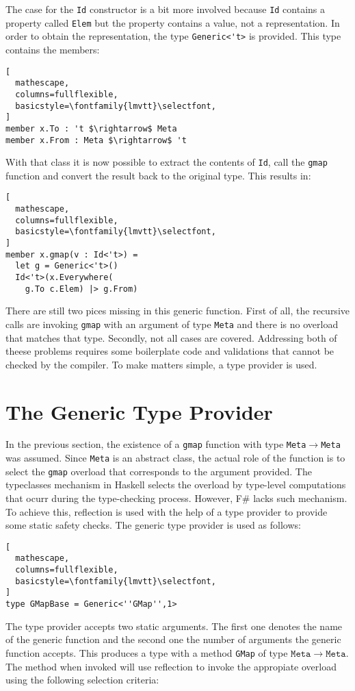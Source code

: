 \documentclass{sigplanconf}
\begin{document}
The case for the \verb+Id+ constructor is a bit more involved because \verb+Id+ contains a property called \verb+Elem+ but the property contains a value, not a representation. In order to obtain the representation, the type \verb+Generic<'t>+ is provided. This type contains the members:
\begin{lstlisting}[
  mathescape,
  columns=fullflexible,
  basicstyle=\fontfamily{lmvtt}\selectfont,
]
member x.To : 't $\rightarrow$ Meta
member x.From : Meta $\rightarrow$ 't
\end{lstlisting}
With that class it is now possible to extract the contents of \verb+Id+, call the \verb+gmap+ function and convert the result back to the original type. This results in:
\begin{lstlisting}[
  mathescape,
  columns=fullflexible,
  basicstyle=\fontfamily{lmvtt}\selectfont,
]
member x.gmap(v : Id<'t>) =
  let g = Generic<'t>()
  Id<'t>(x.Everywhere(
    g.To c.Elem) |> g.From)
\end{lstlisting}
There are still two pices missing in this generic function. First of all, the recursive calls are invoking \verb+gmap+ with an argument of type \verb+Meta+ and there is no overload that matches that type. Secondly, not all cases are covered. Addressing both of theese problems requires some boilerplate code and validations that cannot be checked by the compiler. To make matters simple, a type provider is used.
\section{The Generic Type Provider}
In the previous section, the existence of a \verb+gmap+ function with type \verb+Meta+$\to$\verb+Meta+ was assumed. Since \verb+Meta+ is an abstract class, the actual role of the function is to select the \verb+gmap+ overload that corresponds to the argument provided. The typeclasses mechanism in Haskell selects the overload by type-level computations that ocurr during the type-checking process. However, F\# lacks such mechanism. To achieve this, reflection is used with the help of a type provider to provide some static safety checks. The generic type provider is used as follows:
\begin{lstlisting}[
  mathescape,
  columns=fullflexible,
  basicstyle=\fontfamily{lmvtt}\selectfont,
]
type GMapBase = Generic<''GMap'',1>
\end{lstlisting}
The type provider accepts two static arguments. The first one denotes the name of the generic function and the second one the number of arguments the generic function accepts. This produces a type with a method \verb+GMap+ of type $\mathtt{Meta} \to \mathtt{Meta}$. The method when invoked will use reflection to invoke the appropiate overload using the following selection criteria:
\end{document}

